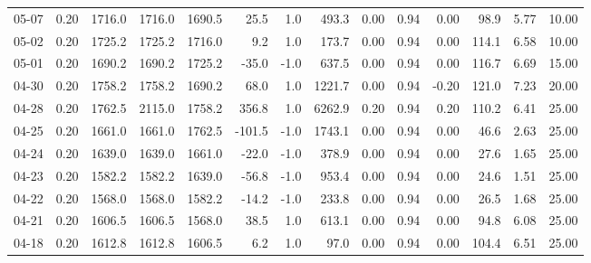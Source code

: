 \begin{threeparttable}
{\begin{tabular}{lrrrrrrrrrrrrr}
  05-07 &     0.20 & 1716.0 & 1716.0 & 1690.5 &       25.5 &                      1.0 &               493.3 &       0.00 &      0.94 &           0.00 &             98.9 &            5.77 &                  10.00 \\
  05-02 &     0.20 & 1725.2 & 1725.2 & 1716.0 &        9.2 &                      1.0 &               173.7 &       0.00 &      0.94 &           0.00 &            114.1 &            6.58 &                  10.00 \\
  05-01 &     0.20 & 1690.2 & 1690.2 & 1725.2 &      -35.0 &                     -1.0 &               637.5 &       0.00 &      0.94 &           0.00 &            116.7 &            6.69 &                  15.00 \\
  04-30 &     0.20 & 1758.2 & 1758.2 & 1690.2 &       68.0 &                      1.0 &              1221.7 &       0.00 &      0.94 &          -0.20 &            121.0 &            7.23 &                  20.00 \\
  04-28 &     0.20 & 1762.5 & 2115.0 & 1758.2 &      356.8 &                      1.0 &              6262.9 &       0.20 &      0.94 &           0.20 &            110.2 &            6.41 &                  25.00 \\
  04-25 &     0.20 & 1661.0 & 1661.0 & 1762.5 &     -101.5 &                     -1.0 &              1743.1 &       0.00 &      0.94 &           0.00 &             46.6 &            2.63 &                  25.00 \\
  04-24 &     0.20 & 1639.0 & 1639.0 & 1661.0 &      -22.0 &                     -1.0 &               378.9 &       0.00 &      0.94 &           0.00 &             27.6 &            1.65 &                  25.00 \\
  04-23 &     0.20 & 1582.2 & 1582.2 & 1639.0 &      -56.8 &                     -1.0 &               953.4 &       0.00 &      0.94 &           0.00 &             24.6 &            1.51 &                  25.00 \\
  04-22 &     0.20 & 1568.0 & 1568.0 & 1582.2 &      -14.2 &                     -1.0 &               233.8 &       0.00 &      0.94 &           0.00 &             26.5 &            1.68 &                  25.00 \\
  04-21 &     0.20 & 1606.5 & 1606.5 & 1568.0 &       38.5 &                      1.0 &               613.1 &       0.00 &      0.94 &           0.00 &             94.8 &            6.08 &                  25.00 \\
  04-18 &     0.20 & 1612.8 & 1612.8 & 1606.5 &        6.2 &                      1.0 &                97.0 &       0.00 &      0.94 &           0.00 &            104.4 &            6.51 &                  25.00 \\

\end{tabular}}
\end{threeparttable}

